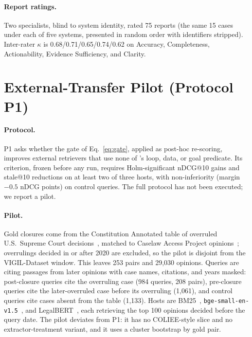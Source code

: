 \paragraph{Report ratings.}
Two specialists, blind to system identity, rated 75 reports (the same 15 cases under each of five systems, presented in random order with identifiers stripped).
Inter-rater $\kappa$ is 0.68/0.71/0.65/0.74/0.62 on Accuracy, Completeness, Actionability, Evidence Sufficiency, and Clarity.

\section{External-Transfer Pilot (Protocol P1)}
\label{app:p1}

\paragraph{Protocol.}
P1 asks whether the gate of Eq.~\eqref{eq:gate}, applied as post-hoc re-scoring, improves external retrievers that use none of \sysname{}'s loop, data, or goal predicate.
Its criterion, frozen before any run, requires Holm-significant nDCG@10 gains and stale@10 reductions on at least two of three hosts, with non-inferiority (margin $-0.5$ nDCG points) on control queries.
The full protocol has not been executed; we report a pilot.

\paragraph{Pilot.}
Gold closures come from the Constitution Annotated table of overruled U.S.\ Supreme Court decisions~\citep{conan2022}, matched to Caselaw Access Project opinions~\citep{cap2024}; overrulings decided in or after 2020 are excluded, so the pilot is disjoint from the VIGIL-Dataset window.
This leaves 253 pairs and 29{,}030 opinions.
Queries are citing passages from later opinions with case names, citations, and years masked: post-closure queries cite the overruling case (984 queries, 208 pairs), pre-closure queries cite the later-overruled case before its overruling (1{,}061), and control queries cite cases absent from the table (1{,}133).
Hosts are BM25~\citep{robertson2009bm25}, \texttt{bge-small-en-v1.5}~\citep{xiao2024cpack}, and LegalBERT~\citep{chalkidis2020legalbert}, each retrieving the top 100 opinions decided before the query date.
The pilot deviates from P1: it has no COLIEE-style slice and no extractor-treatment variant, and it uses a cluster bootstrap by gold pair.

